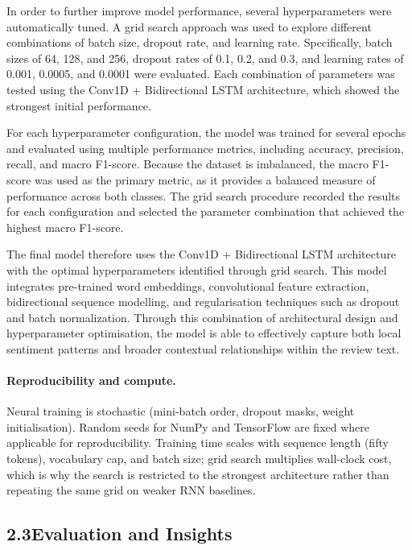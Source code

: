 \documentclass[12pt,a4paper]{article}
\begin{document}
In order to further improve model performance, several hyperparameters were automatically tuned. A grid search approach was used to explore different combinations of batch size, dropout rate, and learning rate. Specifically, batch sizes of 64, 128, and 256, dropout rates of 0.1, 0.2, and 0.3, and learning rates of 0.001, 0.0005, and 0.0001 were evaluated. Each combination of parameters was tested using the Conv1D + Bidirectional LSTM architecture, which showed the strongest initial performance.

For each hyperparameter configuration, the model was trained for several epochs and evaluated using multiple performance metrics, including accuracy, precision, recall, and macro F1-score. Because the dataset is imbalanced, the macro F1-score was used as the primary metric, as it provides a balanced measure of performance across both classes. The grid search procedure recorded the results for each configuration and selected the parameter combination that achieved the highest macro F1-score.

The final model therefore uses the Conv1D + Bidirectional LSTM architecture with the optimal hyperparameters identified through grid search. This model integrates pre-trained word embeddings, convolutional feature extraction, bidirectional sequence modelling, and regularisation techniques such as dropout and batch normalization. Through this combination of architectural design and hyperparameter optimisation, the model is able to effectively capture both local sentiment patterns and broader contextual relationships within the review text.

\paragraph{Reproducibility and compute.}
Neural training is stochastic (mini-batch order, dropout masks, weight initialisation). Random seeds for NumPy and TensorFlow are fixed where applicable for reproducibility. Training time scales with sequence length (fifty tokens), vocabulary cap, and batch size; grid search multiplies wall-clock cost, which is why the search is restricted to the strongest architecture rather than repeating the same grid on weaker RNN baselines.

\subsection{2.3\quad Evaluation and Insights}\label{sec:nlp_eval}
\end{document}
